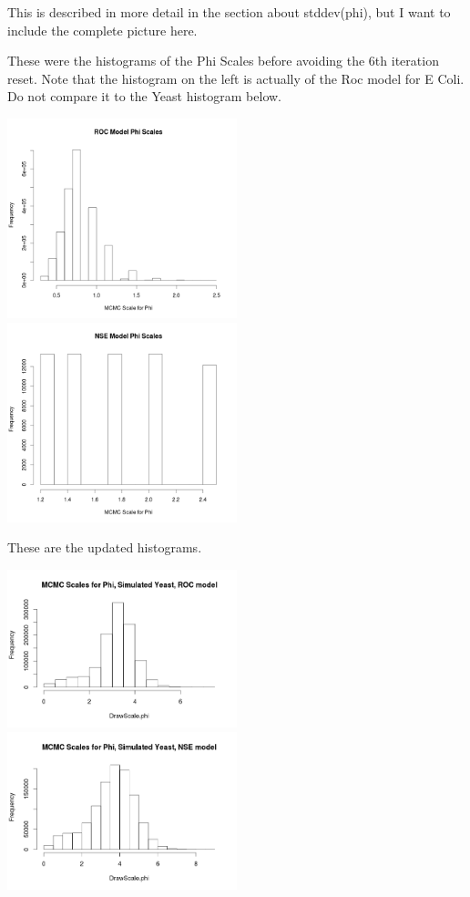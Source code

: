 This is described in more detail in the section about stddev(phi), but I want to include the complete picture here.

These were the histograms of the Phi Scales before avoiding the 6th iteration reset. Note that the histogram on the left is actually of the Roc model for E Coli. Do not compare it to the Yeast histogram below.

\includegraphics[width=0.5\textwidth]{data/oct10-roc-scalehist.png}
\includegraphics[width=0.5\textwidth]{data/oct10-nse-scalehist.png}


These are the updated histograms.

\includegraphics[width=0.5\textwidth]{data/oct17-RocYeastScales.png}
\includegraphics[width=0.5\textwidth]{data/oct17-NseYeastScales.png}


